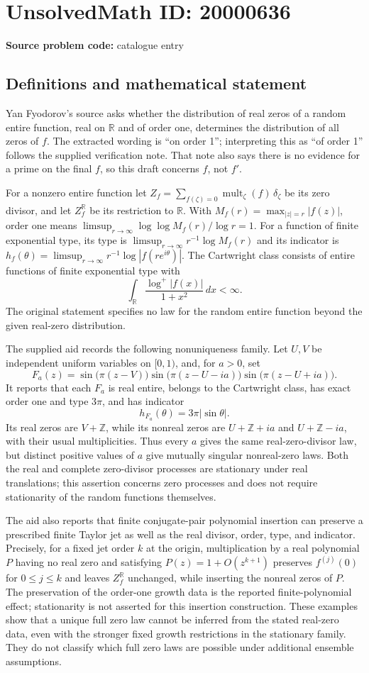 \documentclass[11pt]{article}
\newcommand{\Z}{\mathbb{Z}}
\newcommand{\R}{\mathbb{R}}
\begin{document}
\section*{UnsolvedMath ID: 20000636}
\textbf{Source problem code:} catalogue entry
\subsection{Definitions and mathematical statement}
Yan Fyodorov's source asks whether the distribution of real zeros of a random entire function, real on $\R$ and of order one, determines the distribution of all zeros of $f$. The extracted wording is ``on order 1''; interpreting this as ``of order 1'' follows the supplied verification note. That note also says there is no evidence for a prime on the final $f$, so this draft concerns $f$, not $f'$.

For a nonzero entire function let $Z_f=\sum_{f(\zeta)=0}\operatorname{mult}_\zeta(f)\,\delta_\zeta$ be its zero divisor, and let $Z_f^{\R}$ be its restriction to $\R$. With $M_f(r)=\max_{|z|=r}|f(z)|$, order one means $\limsup_{r\to\infty}\log\log M_f(r)/\log r=1$. For a function of finite exponential type, its type is $\limsup_{r\to\infty}r^{-1}\log M_f(r)$ and its indicator is $h_f(\theta)=\limsup_{r\to\infty}r^{-1}\log|f(re^{i\theta})|$. The Cartwright class consists of entire functions of finite exponential type with
\[
 \int_{\R}\frac{\log^+|f(x)|}{1+x^2}\,dx<\infty.
\]
The original statement specifies no law for the random entire function beyond the given real-zero distribution.

The supplied aid records the following nonuniqueness family. Let $U,V$ be independent uniform variables on $[0,1)$, and, for $a>0$, set
\[
 F_a(z)=\sin\bigl(\pi(z-V)\bigr)
        \sin\bigl(\pi(z-U-ia)\bigr)
        \sin\bigl(\pi(z-U+ia)\bigr).
\]
It reports that each $F_a$ is real entire, belongs to the Cartwright class, has exact order one and type $3\pi$, and has indicator
\[
 h_{F_a}(\theta)=3\pi|\sin\theta|.
\]
Its real zeros are $V+\Z$, while its nonreal zeros are $U+\Z+ia$ and $U+\Z-ia$, with their usual multiplicities. Thus every $a$ gives the same real-zero-divisor law, but distinct positive values of $a$ give mutually singular nonreal-zero laws. Both the real and complete zero-divisor processes are stationary under real translations; this assertion concerns zero processes and does not require stationarity of the random functions themselves.

The aid also reports that finite conjugate-pair polynomial insertion can preserve a prescribed finite Taylor jet as well as the real divisor, order, type, and indicator. Precisely, for a fixed jet order $k$ at the origin, multiplication by a real polynomial $P$ having no real zero and satisfying $P(z)=1+O(z^{k+1})$ preserves $f^{(j)}(0)$ for $0\leq j\leq k$ and leaves $Z_f^{\R}$ unchanged, while inserting the nonreal zeros of $P$. The preservation of the order-one growth data is the reported finite-polynomial effect; stationarity is not asserted for this insertion construction. These examples show that a unique full zero law cannot be inferred from the stated real-zero data, even with the stronger fixed growth restrictions in the stationary family. They do not classify which full zero laws are possible under additional ensemble assumptions.
\end{document}
